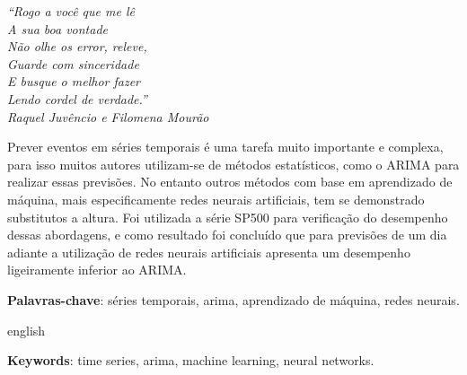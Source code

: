 \documentclass[
    12pt,
    oneside,
    a4paper,
    english,
    brazil
]{abntex2}
\begin{document}
\frenchspacing

\imprimircapa{}

\imprimirfolhaderosto{}

\begin{epigrafe}
    \vspace*{\fill}
    \begin{flushright}
        \textit{``Rogo a você que me lê\\
        A sua boa vontade\\
        Não olhe os error, releve,\\
        Guarde com sinceridade\\
        E busque o melhor fazer\\
        Lendo cordel de verdade.''\\
        Raquel Juvêncio e Filomena Mourão}
    \end{flushright}
\end{epigrafe}

\begin{resumo}

    Prever  eventos  em  séries  temporais  é uma  tarefa  muito  importante  e
    complexa,  para isso  muitos autores  utilizam-se de  métodos estatísticos,
    como  o ARIMA  para realizar  essas  previsões. No  entanto outros  métodos
    com  base em  aprendizado de  máquina, mais  especificamente redes  neurais
    artificiais, tem se demonstrado substitutos a altura. Foi utilizada a série
    SP500 para  verificação do desempenho  dessas abordagens, e  como resultado
    foi concluído  que para previsões de  um dia adiante a  utilização de redes
    neurais  artificiais  apresenta  um  desempenho  ligeiramente  inferior  ao
    ARIMA\@.

    \textbf{Palavras-chave}: séries temporais, arima, aprendizado de máquina,
    redes neurais.
\end{resumo}

\begin{resumo}[Abstract]
    \begin{otherlanguage*}{english}

        \textbf{Keywords}: time series, arima, machine learning, neural
        networks.
    \end{otherlanguage*}
\end{resumo}

\textual{}

\tableofcontents*
\cleardoublepage{}
\end{document}

